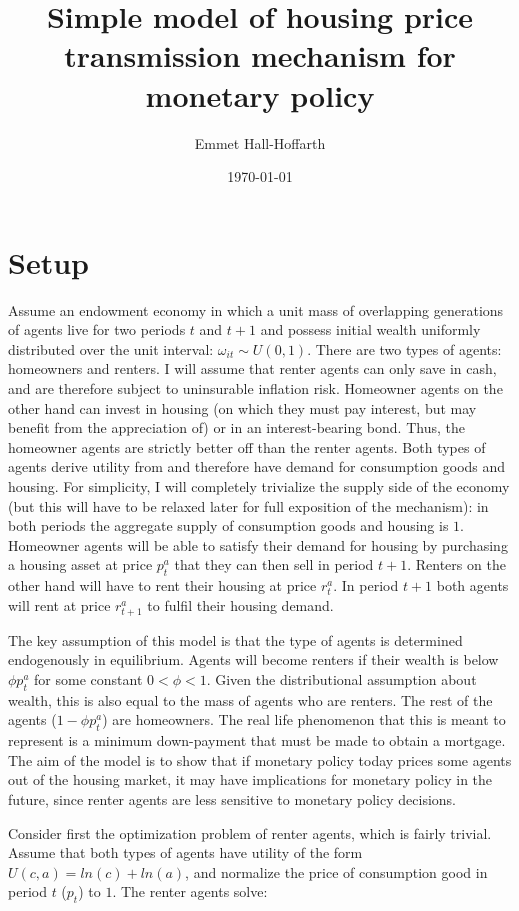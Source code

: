 \documentclass{article}
\title{Simple model of housing price transmission mechanism for monetary policy}
\author{Emmet Hall-Hoffarth}
\date{\today}
\begin{document}
\maketitle
    
\section{Setup}

Assume an endowment economy in which a unit mass of overlapping generations of agents live for two periods $t$ and $t+1$ and possess initial wealth uniformly distributed over the unit interval: $\omega_{it} \sim U(0,1)$. There are two types of agents: homeowners and renters. I will assume that renter agents can only save in cash, and are therefore subject to uninsurable inflation risk. Homeowner agents on the other hand can invest in housing (on which they must pay interest, but may benefit from the appreciation of) or in an interest-bearing bond. Thus, the homeowner agents are strictly better off than the renter agents. Both types of agents derive utility from and therefore have demand for consumption goods and housing. For simplicity, I will completely trivialize the supply side of the economy (but this will have to be relaxed later for full exposition of the mechanism): in both periods the aggregate supply of consumption goods and housing is $1$. Homeowner agents will be able to satisfy their demand for housing by purchasing a housing asset at price $p^a_t$ that they can then sell in period $t+1$. Renters on the other hand will have to rent their housing at price $r^a_t$. In period $t+1$ both agents will rent at price $r^a_{t+1}$ to fulfil their housing demand.

The key assumption of this model is that the type of agents is determined endogenously in equilibrium. Agents will become renters if their wealth is below $\phi p^a_t$ for some constant $0 < \phi < 1$. Given the distributional assumption about wealth, this is also equal to the mass of agents who are renters. The rest of the agents ($1 - \phi p^a_t$) are homeowners. The real life phenomenon that this is meant to represent is a minimum down-payment that must be made to obtain a mortgage. The aim of the model is to show that if monetary policy today prices some agents out of the housing market, it may have implications for monetary policy in the future, since renter agents are less sensitive to monetary policy decisions.

Consider first the optimization problem of renter agents, which is fairly trivial. Assume that both types of agents have utility of the form $U(c, a) = ln(c) + ln(a)$, and normalize the price of consumption good in period $t$ ($p_t$) to $1$. The renter agents solve:
\end{document}
